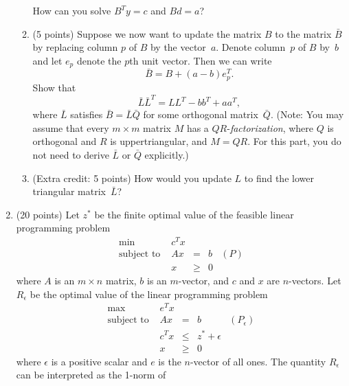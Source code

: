 \documentclass[12pt]{article}
\begin{document}
\begin{enumerate}
\begin{enumerate}
        How can you solve $B^Ty=c$ and $Bd=a$?
      \item (5 points)
        Suppose we now want to update the matrix $B$ to the matrix $\bar{B}$
        by replacing column $p$ of $B$ by the vector~$a$.
        Denote column~$p$ of $B$ by~$b$ and let $e_p$ denote the $p$th unit
        vector.
        Then we can write
        \begin{displaymath}
          \bar{B}=B+(a-b)e_p^T.
        \end{displaymath}
        Show that
        \begin{displaymath}
          \bar{L}\bar{L}^T = LL^T - bb^T +aa^T,
        \end{displaymath}
        where $\bar{L}$ satisfies $\bar{B}=\bar{L}\bar{Q}$ for some orthogonal
        matrix~$\bar{Q}$.
        (Note: You may assume that every $m \times m$ matrix $M$ has a
       ${\mathit QR}$-{\em factorization},
       where $Q$ is orthogonal and $R$ is uppertriangular, and $M=QR$.
      For this part, you do not need to derive $\bar{L}$ or $\bar{Q}$ explicitly.)
   \item (Extra credit: 5 points)
      How would you update $L$ to find the lower triangular matrix~$\bar{L}$?
    \end{enumerate}
\item (20 points)
Let $z^*$ be the finite optimal value of the feasible linear programming problem
\begin{displaymath}
\begin{array}{lrclr}
\min & c^Tx \\
\mbox{subject to } & Ax & = & b & (P) \\
& x & \geq & 0
\end{array}
\end{displaymath}
where $A$ is an $m \times n$ matrix,
$b$ is an $m$-vector,
and $c$ and $x$ are $n$-vectors.
Let $R_{\epsilon}$ be the optimal value of the linear programming problem
\begin{displaymath}
\begin{array}{lrclr}
\max & e^Tx \\
\mbox{subject to } & Ax & = & b & (P_{\epsilon}) \\
& c^Tx & \leq & z^* + \epsilon \\
& x & \geq & 0
\end{array}
\end{displaymath}
where $\epsilon$ is a positive scalar and $e$ is the $n$-vector of all ones.
The quantity $R_{\epsilon}$ can be interpreted as the 1-norm of

\end{enumerate}
\end{document}

